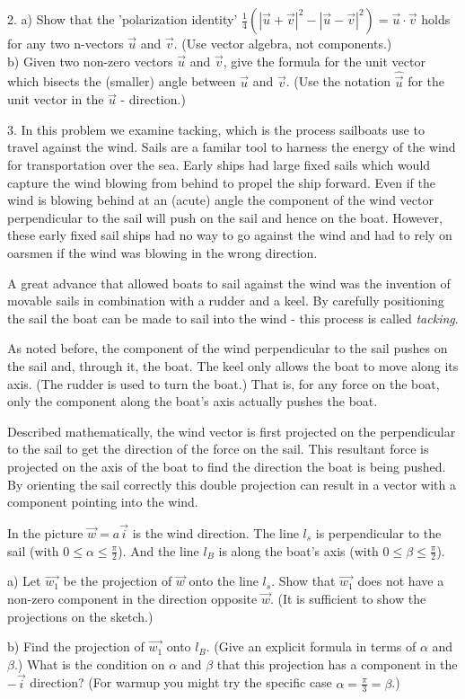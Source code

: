\documentclass{article}
\begin{document}
2. a) Show that the 'polarization identity'
$\frac{1}{4}\left( |\vec{u} + \vec{v}|^{2} - |\vec{u} - \vec{v}|^{2} \right) =
\vec{u} \cdot \vec{v}$ holds for any two n-vectors $\vec{u}$ and $\vec{v}$. (Use
vector algebra, not components.) \\
b) Given two non-zero vectors $\vec{u}$ and $\vec{v}$, give the formula for the
unit vector which bisects the (smaller) angle between $\vec{u}$ and $\vec{v}$.
(Use the notation $\hat{\vec{u}}$ for the unit vector in the $\vec{u}$ -
direction.)

3. In this problem we examine tacking, which is the process sailboats use to
travel against the wind. Sails are a familar tool to harness the energy of the
wind for transportation over the sea. Early ships had large fixed sails which
would capture the wind blowing from behind to propel the ship forward. Even if
the wind is blowing behind at an (acute) angle the component of the wind vector
perpendicular to the sail will push on the sail and hence on the boat. However,
these early fixed sail ships had no way to go against the wind and had to rely
on oarsmen if the wind was blowing in the wrong direction.

A great advance that allowed boats to sail against the wind was the invention
of movable sails in combination with a rudder and a keel. By carefully
positioning the sail the boat can be made to sail into the wind - this process
is called \emph{tacking}.

As noted before, the component of the wind perpendicular to the sail pushes on
the sail and, through it, the boat. The keel only allows the boat to move along
its axis. (The rudder is used to turn the boat.) That is, for any force on the
boat, only the component along the boat's axis actually pushes the boat.

Described mathematically, the wind vector is first projected on the
perpendicular to the sail to get the direction of the force on the sail. This
resultant force is projected on the axis of the boat to find the direction the
boat is being pushed. By orienting the sail correctly this double projection
can result in a vector with a component pointing into the wind.

In the picture $\vec{w} = a \vec{i}$ is the wind direction. The line $l_{s}$
is perpendicular to the sail (with $0 \leq \alpha \leq \frac{\pi}{2}$). And the
line $l_{B}$ is along the boat's axis (with $0 \leq \beta \leq \frac{\pi}{2}$).

a) Let $\vec{w_{1}}$ be the projection of $\vec{w}$ onto the line $l_{s}$. Show
that $\vec{w_{1}}$ does not have a non-zero component in the direction opposite
$\vec{w}$. (It is sufficient to show the projections on the sketch.)

b) Find the projection of $\vec{w_{1}}$ onto $l_{B}$. (Give an explicit formula
in terms of $\alpha$ and $\beta$.) What is the condition on $\alpha$ and $\beta$
that this projection has a component in the $-\vec{i}$ direction? (For warmup
you might try the specific case $\alpha = \frac{\pi}{3} = \beta$.)
\end{document}
